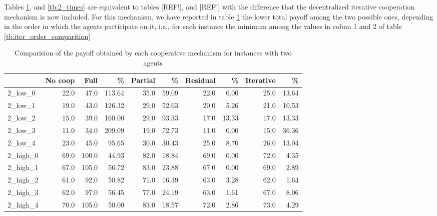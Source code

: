 \documentclass[authoryear]{elsarticle}
\begin{document}
Tables \ref{tb:2_payoffs}, and \ref{tb:2_times} are equivalent to tables [REF!], and [REF!] with the difference that the decentralized iterative cooperation mechanism is now included. For this mechanism, we have reported in table \ref{tb:2_payoffs} the lower total payoff among the two possible ones, depending in the order in which the agents participate on it, i.e., for each instance the minimum among the values in colum 1 and 2 of table \ref{tb:iter_order_comparition}

\begin{table}[h!]
\centering
\caption{Comparision of the payoff obtained by each cooperative mechanism for instances with two agents \label{tb:2_payoffs}}
\begin{adjustbox}{max width=\textwidth}
\begin{tabular}{lrrrrrrrrr}
\toprule
{} &  No coop &   Full &   \% &  Partial &  \% &  Residual &  \% &  Iterative &  \% \\
\midrule
2\_low\_0  &            22.0 &   47.0 &  113.64 &     35.0 &     59.09 &      22.0 &       0.00 &       25.0 &       13.64 \\
2\_low\_1  &            19.0 &   43.0 &  126.32 &     29.0 &     52.63 &      20.0 &       5.26 &       21.0 &       10.53 \\
2\_low\_2  &            15.0 &   39.0 &  160.00 &     29.0 &     93.33 &      17.0 &      13.33 &       17.0 &       13.33 \\
2\_low\_3  &            11.0 &   34.0 &  209.09 &     19.0 &     72.73 &      11.0 &       0.00 &       15.0 &       36.36 \\
2\_low\_4  &            23.0 &   45.0 &   95.65 &     30.0 &     30.43 &      25.0 &       8.70 &       26.0 &       13.04 \\
2\_high\_0 &            69.0 &  100.0 &   44.93 &     82.0 &     18.84 &      69.0 &       0.00 &       72.0 &        4.35 \\
2\_high\_1 &            67.0 &  105.0 &   56.72 &     83.0 &     23.88 &      67.0 &       0.00 &       69.0 &        2.89 \\
2\_high\_2 &            61.0 &   92.0 &   50.82 &     71.0 &     16.39 &      63.0 &       3.28 &       62.0 &        1.64 \\
2\_high\_3 &            62.0 &   97.0 &   56.45 &     77.0 &     24.19 &      63.0 &       1.61 &       67.0 &        8.06 \\
2\_high\_4 &            70.0 &  105.0 &   50.00 &     83.0 &     18.57 &      72.0 &       2.86 &       73.0 &        4.29 \\
\bottomrule
\end{tabular}
\end{adjustbox}
\end{table}
\end{document}
